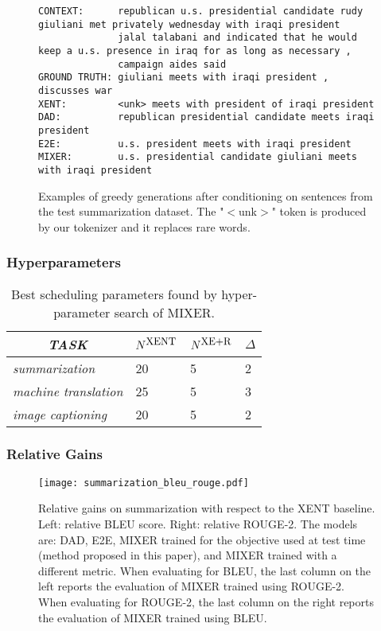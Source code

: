 \documentclass{article} \usepackage{iclr2016_conference,times}
\begin{document}
\begin{figure}[h!]
{\begin{verbatim}
CONTEXT:      republican u.s. presidential candidate rudy giuliani met privately wednesday with iraqi president 
              jalal talabani and indicated that he would keep a u.s. presence in iraq for as long as necessary , 
              campaign aides said
GROUND TRUTH: giuliani meets with iraqi president , discusses war
XENT:         <unk> meets with president of iraqi president
DAD:          republican presidential candidate meets iraqi president
E2E:          u.s. president meets with iraqi president
MIXER:        u.s. presidential candidate giuliani meets with iraqi president
\end{verbatim}
}
\caption{Examples of greedy generations after conditioning on sentences from the test summarization dataset. The "$<$unk$>$" token is produced by our tokenizer and it replaces rare words.} 
\label{fig:generation}
\end{figure}


\subsubsection{Hyperparameters}
\begin{table}[!h]
\caption{Best scheduling parameters found by hyper-parameter search of MIXER.}
\begin{tabular}{l || l | l | l}
      \multicolumn{1}{c||}{\emph{TASK} }  & 
      \multicolumn{1}{c|}{$N^{\mbox{\small XENT}}$} & 
      \multicolumn{1}{c|}{$N^{\mbox{\small XE+R}}$} & \multicolumn{1}{c}{$\Delta$} \\
      \hline
      \hline
      {\em summarization} & 20 & 5 & 2  \\
      \hline
      {\em machine translation} & 25 & 5 & 3 \\
      \hline
      {\em image captioning} & 20 & 5 & 2  \\
    \end{tabular}
\label{tab:scheduling}
\end{table}

\subsubsection{Relative Gains}


\begin{figure}[!h]
\begin{center}
 \texttt{[image: summarization\_bleu\_rouge.pdf]}
 \end{center}
\caption{Relative gains on summarization with respect to the XENT baseline. Left: relative BLEU score. Right: relative ROUGE-2.
The models are: DAD, E2E, MIXER trained for the objective used at test time (method proposed in this paper), and MIXER trained with a different metric.
When evaluating for BLEU, the last column on the left reports the evaluation of MIXER trained using ROUGE-2.
When evaluating for ROUGE-2, the last column on the right reports the evaluation of MIXER trained using BLEU.}
\label{fig:summarization_bleu_rouge}
\end{figure}
\end{document}
